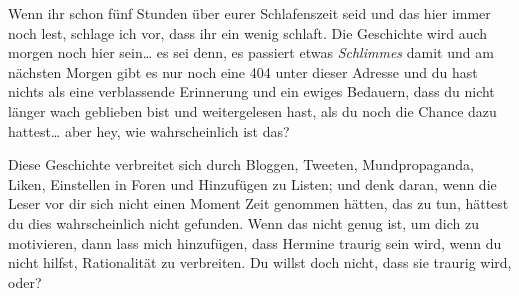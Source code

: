 \begin{chapterOpeningAuthorNote}
Wenn ihr schon fünf Stunden über eurer Schlafenszeit seid und das hier immer noch lest, schlage ich vor, dass ihr ein wenig schlaft. Die Geschichte wird auch morgen noch hier sein… es sei denn, es passiert etwas \emph{Schlimmes} damit und am nächsten Morgen gibt es nur noch eine 404 unter dieser Adresse und du hast nichts als eine verblassende Erinnerung und ein ewiges Bedauern, dass du nicht länger wach geblieben bist und weitergelesen hast, als du noch die Chance dazu hattest… aber hey, wie wahrscheinlich ist das?

Diese Geschichte verbreitet sich durch Bloggen, Tweeten, Mundpropaganda, Liken, Einstellen in Foren und Hinzufügen zu Listen; und denk daran, wenn die Leser vor dir sich nicht einen Moment Zeit genommen hätten, das zu tun, hättest du dies wahrscheinlich nicht gefunden. Wenn das nicht genug ist, um dich zu motivieren, dann lass mich hinzufügen, dass Hermine traurig sein wird, wenn du nicht hilfst, Rationalität zu verbreiten. Du willst doch nicht, dass sie traurig wird, oder?


\end{chapterOpeningAuthorNote}
